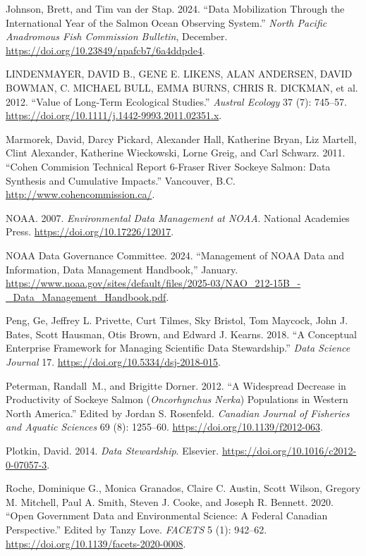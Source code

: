 \documentclass[
  letterpaper,
  DIV=11,
  numbers=noendperiod]{scrartcl}
\newlength{\cslhangindent}
\newenvironment{CSLReferences}[2] %
 {\begin{list}{}{%
  \setlength{\itemindent}{0pt}
  \setlength{\leftmargin}{0pt}
  \setlength{\parsep}{0pt}
  \ifodd #1
   \setlength{\leftmargin}{\cslhangindent}
   \setlength{\itemindent}{-1\cslhangindent}
  \fi
  \setlength{\itemsep}{#2\baselineskip}}}
 {\end{list}}
\begin{document}
\begin{CSLReferences}{1}{0}
Johnson, Brett, and Tim van der Stap. 2024. {``Data Mobilization Through
the International Year of the Salmon Ocean Observing System.''}
\emph{North Pacific Anadromous Fish Commission Bulletin}, December.
\url{https://doi.org/10.23849/npafcb7/6a4ddpde4}.

LINDENMAYER, DAVID B., GENE E. LIKENS, ALAN ANDERSEN, DAVID BOWMAN, C.
MICHAEL BULL, EMMA BURNS, CHRIS R. DICKMAN, et al. 2012. {``Value of
Long{-}Term Ecological Studies.''} \emph{Austral Ecology} 37 (7):
745--57. \url{https://doi.org/10.1111/j.1442-9993.2011.02351.x}.

Marmorek, David, Darcy Pickard, Alexander Hall, Katherine Bryan, Liz
Martell, Clint Alexander, Katherine Wieckowski, Lorne Greig, and Carl
Schwarz. 2011. {``Cohen Commision Technical Report 6-Fraser River
Sockeye Salmon: Data Synthesis and Cumulative Impacts.''} Vancouver,
B.C. \url{http://www.cohencommission.ca/}.

NOAA. 2007. \emph{Environmental Data Management at NOAA}. National
Academies Press. \url{https://doi.org/10.17226/12017}.

NOAA Data Governance Committee. 2024. {``Management of NOAA Data and
Information, Data Management Handbook,''} January.
\url{https://www.noaa.gov/sites/default/files/2025-03/NAO_212-15B_-_Data_Management_Handbook.pdf}.

Peng, Ge, Jeffrey L. Privette, Curt Tilmes, Sky Bristol, Tom Maycock,
John J. Bates, Scott Hausman, Otis Brown, and Edward J. Kearns. 2018.
{``A Conceptual Enterprise Framework for Managing Scientific Data
Stewardship.''} \emph{Data Science Journal} 17.
\url{https://doi.org/10.5334/dsj-2018-015}.

Peterman, Randall~M., and Brigitte Dorner. 2012. {``A Widespread
Decrease in Productivity of Sockeye Salmon ({\emph{Oncorhynchus Nerka}})
Populations in Western North America.''} Edited by Jordan S. Rosenfeld.
\emph{Canadian Journal of Fisheries and Aquatic Sciences} 69 (8):
1255--60. \url{https://doi.org/10.1139/f2012-063}.

Plotkin, David. 2014. \emph{Data Stewardship}. Elsevier.
\url{https://doi.org/10.1016/c2012-0-07057-3}.

Roche, Dominique G., Monica Granados, Claire C. Austin, Scott Wilson,
Gregory M. Mitchell, Paul A. Smith, Steven J. Cooke, and Joseph R.
Bennett. 2020. {``Open Government Data and Environmental Science: A
Federal Canadian Perspective.''} Edited by Tanzy Love. \emph{FACETS} 5
(1): 942--62. \url{https://doi.org/10.1139/facets-2020-0008}.


\end{CSLReferences}
\end{document}
